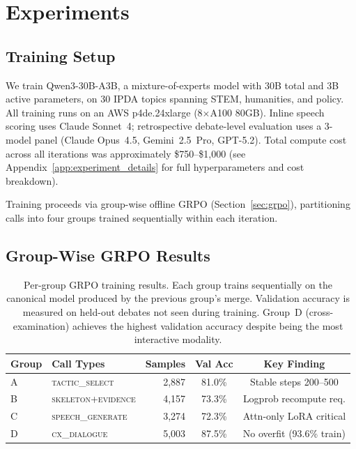 \section{Experiments}
\label{sec:experiments}

\subsection{Training Setup}
\label{sec:training_setup}

We train Qwen3-30B-A3B, a mixture-of-experts model with 30B total and
3B active parameters, on 30 IPDA topics spanning STEM, humanities, and
policy. All training runs on an AWS p4de.24xlarge (8$\times$A100 80GB).
Inline speech scoring uses Claude Sonnet~4; retrospective debate-level
evaluation uses a 3-model panel (Claude Opus~4.5, Gemini~2.5~Pro,
GPT-5.2). Total compute cost across all iterations was approximately
\$750--\$1{,}000 (see Appendix~\ref{app:experiment_details} for full
hyperparameters and cost breakdown).

Training proceeds via group-wise offline GRPO
(Section~\ref{sec:grpo}), partitioning calls into four groups trained
sequentially within each iteration.

\subsection{Group-Wise GRPO Results}
\label{sec:phase1}

\begin{table}[t]
\centering
\small
\begin{tabular}{llrcc}
\toprule
\textbf{Group} & \textbf{Call Types} & \textbf{Samples} & \textbf{Val Acc} & \textbf{Key Finding} \\
\midrule
A & \textsc{tactic\_select} & 2{,}887 & 81.0\% & Stable steps 200--500 \\
B & \textsc{skeleton{+}evidence} & 4{,}157 & 73.3\% & Logprob recompute req. \\
C & \textsc{speech\_generate} & 3{,}274 & 72.3\% & Attn-only LoRA critical \\
D & \textsc{cx\_dialogue} & 5{,}003 & 87.5\% & No overfit (93.6\% train) \\
\bottomrule
\end{tabular}
\caption{Per-group GRPO training results. Each group trains sequentially on
the canonical model produced by the previous group's merge. Validation
accuracy is measured on held-out debates not seen during training. Group~D
(cross-examination) achieves the highest validation accuracy despite being
the most interactive modality.}
\label{tab:phase1}
\end{table}

